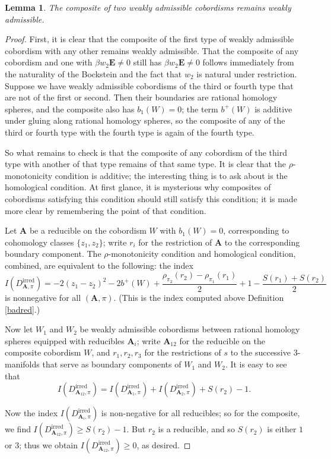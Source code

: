 \documentclass[10pt,a4paper]{amsart}
\newtheorem{lemma}[theorem]{Lemma}
\theoremstyle{definition}
\theoremstyle{remark}
\numberwithin{figure}{qchap}
\begin{document}
\begin{lemma}\label{composable-cob}The composite of two weakly admissible cobordisms remains weakly admissible.
\end{lemma}
\begin{proof}First, it is clear that the composite of the first type of weakly admissible cobordism with any other remains weakly admissible. That the composite of any cobordism and one with $\beta w_2 \mathbf{E} \neq 0$ still has $\beta w_2 \mathbf{E} \neq 0$ follows immediately from the naturality of the Bockstein and the fact that $w_2$ is natural under restriction. Suppose we have weakly admissible cobordisms of the third or fourth type that are not of the first or second. Then their boundaries are rational homology spheres, and the composite also has $b_1(W) = 0$; the term $b^+(W)$ is additive under gluing along rational homology spheres, so the composite of any of the third or fourth type with the fourth type is again of the fourth type.

So what remains to check is that the composite of any cobordism of the third type with another of that type remains of that same type. It is clear that the $\rho$-monotonicity condition is additive; the interesting thing is to ask about is the homological condition. At first glance, it is mysterious why composites of cobordisms satisfying this condition should still satisfy this condition; it is made more clear by remembering the point of that condition.

Let $\mathbf{A}$ be a reducible on the cobordism $W$ with $b_1(W) = 0$, corresponding to cohomology classes $\{z_1, z_2\}$; write $r_i$ for the restriction of $\mathbf{A}$ to the corresponding boundary component.
The $\rho$-monotonicity condition and homological condition, combined, are equivalent to the following: the index $$I(D^\text{irred}_{\mathbf{A},\pi}) = -2(z_1-z_2)^2 - 2b^+(W) + \frac{\rho_{\pi_2}(r_2) - \rho_{\pi_1}(r_1)}{2} + 1 - \frac{S(r_1) + S(r_2)}{2}$$ is nonnegative for all $(\mathbf{A},\pi)$. (This is the index computed above Definition \ref{badred}.)

Now let $W_1$ and $W_2$ be weakly admissible cobordisms between rational homology spheres equipped with reducibles $\mathbf{A}_i$; write $\mathbf{A}_{12}$ for the reducible on the composite cobordism $W$, and $r_1, r_2, r_3$ for the restrictions of $s$ to the successive 3-manifolds that serve as boundary components of $W_1$ and $W_2$. It is easy to see that $$I(D^{\text{irred}}_{\mathbf{A}_{12},\pi}) = I(D^{\text{irred}}_{\mathbf{A}_1,\pi}) + I(D^{\text{irred}}_{\mathbf{A}_2,\pi}) + S(r_2) - 1.$$

Now the index $I(D^{\text{irred}}_{\mathbf{A}_i,\pi})$ is non-negative for all reducibles; so for the composite, we find $I(D^{\text{irred}}_{\mathbf{A}_{12},\pi}) \geq S(r_2) - 1.$ But $r_2$ is a reducible, and so $S(r_2)$ is either $1$ or $3$; thus we obtain $I(D^{\text{irred}}_{\mathbf{A}_{12},\pi}) \geq 0$, as desired.
\end{proof}
\end{document}
